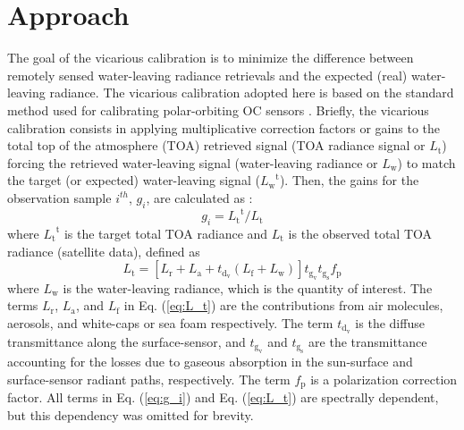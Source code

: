 \documentclass[]{interact}
\theoremstyle{plain}%
\theoremstyle{definition}
\theoremstyle{remark}
\begin{document}
\section{Approach}
The goal of the vicarious calibration is to minimize the difference between remotely sensed water-leaving radiance retrievals and the expected (real) water-leaving radiance. The vicarious calibration adopted here is based on the standard method used for calibrating polar-orbiting OC sensors \citep{Franz:07}. Briefly, the vicarious calibration consists in applying multiplicative correction factors or gains to the total top of the atmosphere (TOA) retrieved signal (TOA radiance signal or $L_\text{t}$) forcing the retrieved water-leaving signal (water-leaving radiance or $L_\text{w}$) to match the target (or expected) water-leaving signal (${L_\text{w}}^\text{t}$). Then, the gains for the observation sample $i^{th}$, $g_i$, are calculated as \cite{Franz:07}:
\begin{equation}\label{eq:g_i}
  g_i={L_\text{t}}^\text{t}/L_\text{t}
\end{equation}
where ${L_\text{t}}^\text{t}$ is the target total TOA radiance and $L_\text{t}$ is the observed total TOA radiance (satellite data), defined as
\begin{equation}\label{eq:L_t}
  L_\text{t}=[L_\text{r}+L_\text{a}+t_{\text{d}_\text{v}}(L_\text{f}+L_\text{w})]t_{\text{g}_\text{v}}t_{\text{g}_\text{s}}f_\text{p}
\end{equation}
where $L_\text{w}$ is the water-leaving radiance, which is the quantity of interest. The terms $L_\text{r}$, $L_\text{a}$, and $L_\text{f}$ in Eq. (\ref{eq:L_t}) are the contributions from air molecules, aerosols, and white-caps or sea foam respectively. The term $t_{\text{d}_\text{v}}$ is the diffuse transmittance along the surface-sensor, and $t_{\text{g}_\text{v}}$ and $t_{\text{g}_\text{s}}$  are the transmittance accounting for the losses due to gaseous absorption in the sun-surface and surface-sensor radiant paths, respectively. The term $f_\text{p}$ is a polarization correction factor. All terms in Eq. (\ref{eq:g_i}) and Eq. (\ref{eq:L_t}) are spectrally dependent, but this dependency was omitted for brevity.
\end{document}
